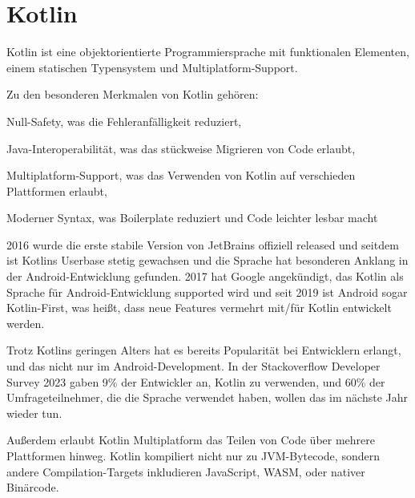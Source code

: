 
\chapter{Kotlin}\label{ch:kotlin}

Kotlin ist eine objektorientierte Programmiersprache mit funktionalen Elementen, einem statischen Typensystem und
Multiplatform-Support.

Zu den besonderen Merkmalen von Kotlin gehören:
\begin{liste}
    \item Null-Safety, was die Fehleranfälligkeit reduziert,
    \item Java-Interoperabilität, was das stückweise Migrieren von Code erlaubt,
    \item Multiplatform-Support, was das Verwenden von Kotlin auf verschieden Plattformen erlaubt,
    \item Moderner Syntax, was Boilerplate reduziert und Code leichter lesbar macht
\end{liste}

2016 wurde die erste stabile Version von JetBrains offiziell released und seitdem ist Kotlins Userbase
stetig gewachsen und die Sprache hat besonderen Anklang in der Android-Entwicklung gefunden.
2017 hat Google angekündigt, das Kotlin als Sprache für Android-Entwicklung supported wird und seit 2019 ist Android
sogar Kotlin-First, was heißt, dass neue Features vermehrt mit/für Kotlin entwickelt werden.

Trotz Kotlins geringen Alters hat es bereits Popularität bei Entwicklern erlangt, und das nicht nur im
Android-Development.
In der Stackoverflow Developer Survey 2023 gaben 9\% der Entwickler an, Kotlin zu verwenden, und 60\% der
Umfrageteilnehmer, die die Sprache verwendet haben, wollen das im nächste Jahr wieder tun.

Außerdem erlaubt Kotlin Multiplatform das Teilen von Code über mehrere Plattformen hinweg.
Kotlin kompiliert nicht nur zu JVM-Bytecode, sondern andere Compilation-Targets inkludieren JavaScript, WASM, oder
nativer Binärcode.\cite{androidDevKotlinFirst, kspecIntroduction, soDevSurvey23, kMediaKit}








